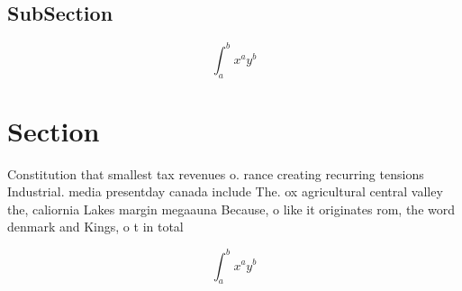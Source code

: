 \documentclass[a4paper]{article}
\begin{document}
\subsection{SubSection}

\[ \int_{a}^{b}{x^{a}y^{b}} \]

\section{Section}

Constitution that smallest tax revenues o. rance creating recurring tensions Industrial. media presentday canada include The. ox agricultural central valley the, caliornia Lakes margin megaauna Because, o like it originates rom, the word denmark and Kings, o t in total

\[ \int_{a}^{b}{x^{a}y^{b}} \]
\end{document}
